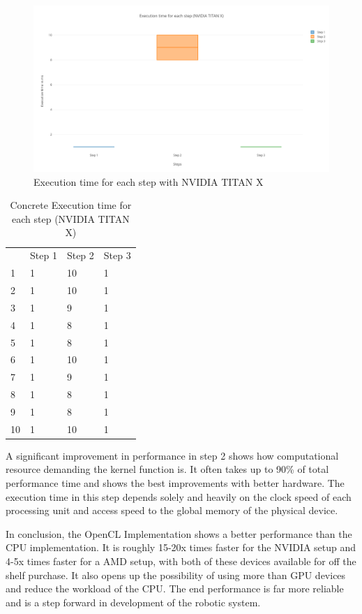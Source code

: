 \begin{figure}[H]
	\centering
	\includegraphics[width=14cm]{images/EachStepNVIDIA.png}
	\caption{Execution time for each step with NVIDIA TITAN X}
	\label{ExampleOCTImage}
\end{figure}
\begin{table}[H]
\caption{Concrete Execution time for each step (NVIDIA TITAN X)}
\centering
\begin{tabular}{llll}
   & Step 1 & Step 2 & Step 3 \\
1  & 1      & 10     & 1      \\
2  & 1      & 10     & 1      \\
3  & 1      & 9      & 1      \\
4  & 1      & 8      & 1      \\
5  & 1      & 8      & 1      \\
6  & 1      & 10     & 1      \\
7  & 1      & 9      & 1      \\
8  & 1      & 8      & 1      \\
9  & 1      & 8      & 1      \\
10 & 1      & 10     & 1     
\end{tabular}
\end{table}
A significant improvement in performance in step 2 shows how computational resource demanding the kernel function is. It often takes up to 90\% of total performance time and shows the best improvements with better hardware. The execution time in this step depends solely and heavily on the clock speed of each processing unit and access speed to the global memory of the physical device.

In conclusion, the OpenCL Implementation shows a better performance than the CPU implementation. It is roughly 15-20x times faster for the NVIDIA setup and 4-5x times faster for a AMD setup, with both of these devices available for off the shelf purchase. It also opens up the possibility of using more than GPU devices and reduce the workload of the CPU. The end performance is far more reliable and is a step forward in development of the robotic system. 

